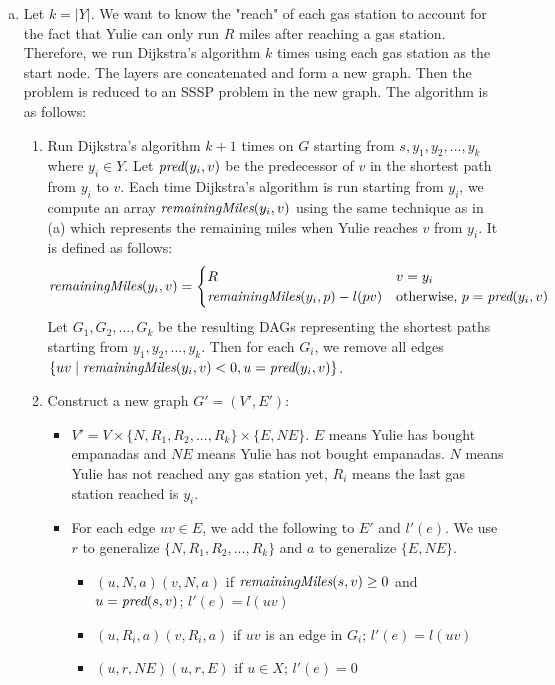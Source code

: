 \documentclass[11pt]{article}
\begin{document}
\begin{solution}
\begin{enumerate}[(a)]
\item 
Let $k=|Y|$. We want to know the "reach" of each gas station to account for the fact that Yulie can only run $R$ miles after reaching a gas station. Therefore, we run Dijkstra's algorithm $k$ times using each gas station as the start node. The layers are concatenated and form a new graph. Then the problem is reduced to an SSSP problem in the new graph. The algorithm is as follows:
\begin{enumerate}[(1)]
\item Run Dijkstra's algorithm $k+1$ times on $G$ starting from $s, y_1, y_2, ..., y_k$ where $y_i\in Y$. Let $\emph{pred}(y_i, v)$ be the predecessor of $v$ in the shortest path from $y_i$ to $v$. Each time Dijkstra's algorithm is run starting from $y_i$, we compute an array $\emph{remainingMiles}(y_i, v)$ using the same technique as in (a) which represents the remaining miles when Yulie reaches $v$ from $y_i$. It is defined as follows:
\begin{equation*}
\emph{remainingMiles}(y_i, v)=
\begin{cases}
	R &v=y_i
\\	\emph{remainingMiles}(y_i, p) - l(pv) &\text{otherwise, }p=\emph{pred}(y_i, v)
\end{cases}
\end{equation*}
Let $G_1, G_2, ..., G_k$ be the resulting DAGs representing the shortest paths starting from $y_1, y_2, ..., y_k$. Then for each $G_i$, we remove all edges $\{uv\mid \emph{remainingMiles}(y_i, v)<0, u=\emph{pred}(y_i, v)\}$.
\item Construct a new graph $G'=(V', E')$:
\begin{itemize}
\item $V'=V\times \{N, R_1, R_2, ..., R_k\} \times \{E, NE\}$. $E$ means Yulie has bought empanadas and $NE$ means Yulie has not bought empanadas. $N$ means Yulie has not reached any gas station yet, $R_i$ means the last gas station reached is $y_i$.
\item For each edge $uv\in E$, we add the following to $E'$ and $l'(e)$. We use $r$ to generalize $\{N, R_1, R_2, ..., R_k\}$ and $a$ to generalize $\{E, NE\}$.
\begin{itemize}
\item $(u, N, a)(v, N, a)$ if $\emph{remainingMiles}(s,v)\ge 0$ and $u=\emph{pred}(s, v)$; $l'(e)=l(uv)$
\item $(u, R_i, a)(v, R_i, a)$ if $uv$ is an edge in $G_i$; $l'(e)=l(uv)$
\item $(u, r, NE)(u, r, E)$ if $u\in X$; $l'(e)=0$

\end{itemize}
\end{itemize}
\end{enumerate}
\end{enumerate}
\end{solution}
\end{document}

